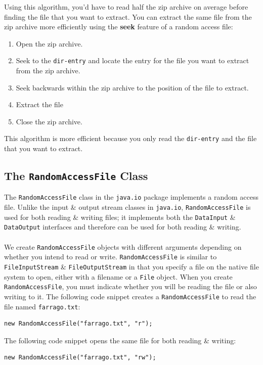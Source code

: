\documentclass[a4paper,11pt]{article}
\begin{document}
Using this algorithm, you'd have to read half the zip archive on average before finding the file that you 
want to extract.
You can extract the same file from the zip archive more efficiently using the \textbf{seek} feature of a 
random access file:
\begin{enumerate}
    \item   Open the zip archive.
    \item   Seek to the \verb|dir-entry| and locate the entry for the file you want to extract from the zip 
            archive.
    \item   Seek backwards within the zip archive to the position of the file to extract.
    \item   Extract the file 
    \item   Close the zip archive.
\end{enumerate}

This algorithm is more efficient because you only read the \verb|dir-entry| and the file that you want to 
extract.

\subsection{The \texttt{RandomAccessFile} Class}
The \verb|RandomAccessFile| class in the \verb|java.io| package implements a random access file.
Unlike the input \& output stream classes in \verb|java.io|, \verb|RandomAccessFile| is used for both 
reading \& writing files; it implements both the \verb|DataInput| \& \verb|DataOutput| interfaces and therefore
can be used for both reading \& writing.
\\\\
We create \verb|RandomAccessFile| objects with different arguments depending on whether you intend to read or 
write.
\verb|RandomAccessFile| is similar to \verb|FileInputStream| \& \verb|FileOutputStream| in that you specify 
a file on the native file system to open, either with a filename or a \verb|File| object.
When you create \verb|RandomAccessFile|, you must indicate whether you will be reading the file or also
writing to it.
The following code snippet creates a \verb|RandomAccessFile| to read the file named \verb|farrago.txt|:
\begin{verbatim}
new RandomAccessFile("farrago.txt", "r");
\end{verbatim}

The following code snippet opens the same file for both reading \& writing:
\begin{verbatim}
new RandomAccessFile("farrago.txt", "rw");
\end{verbatim}
\end{document}
